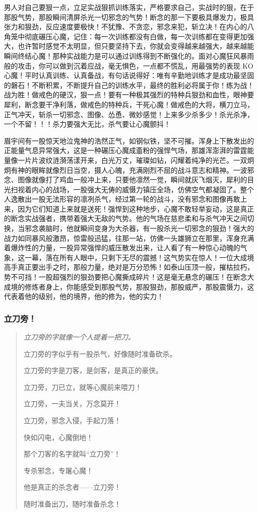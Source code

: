 男人对自己要狠一点，立足实战狠抓训练落实，严格要求自己，实战时的狠，在于那股气势，那股瞬间清屏杀光一切邪念的气势！断念的那一下要极具爆发力，极具张力和狠劲，反应速度要极快！不犹豫、不贪恋，邪念来犯，斩立决！在内心的八角笼中彻底碾压心魔，记住：每一次训练都没有白做，每一次训练都在变得更加强大，也许暂时感觉不太明显，但只要坚持下去，你就会变得越来越强大，越来越能瞬间终结心魔！那种实战能力是可以通过训练得到不断强化的。面对心魔狂风暴雨般的攻击，你可以做到沉着应战，毫无惧色，一点都不慌乱，用最强势的表现 KO 心魔！平时认真训练、认真备战，有句话说得好：唯有辛勤地训练才是成功最坚固的磐石！不断积累，不断提升自己的训练水平，最终的胜利必将属于你！练为战！战为胜！做戒色的硬汉，狠一点！要有一种极其强烈的特种兵狠劲和血性，眼神要犀利，断念要干净利落，做戒色的特种兵，干死心魔！做戒色的大将，横刀立马，正气冲天，斩杀一切邪念、图像、怂恿、微妙感觉！上来多少杀多少！杀光杀净，一个不留！！！杀力要强大无比，杀气要让心魔颤抖！

眉宇间有一股惊天地泣鬼神的浩然正气，如钢似铁，坚不可摧。浑身上下散发出的正能量气息异常强大，这是一种碾压心魔成齑粉的强悍气场，那雄浑澎湃的雷霆能量像一片片波纹涟漪荡漾开来，白光万丈，璀璨如钻，闪耀着纯净的光芒。一双炯炯有神的眼眸就像烈日当空，摄人心魄，充满刚烈不屈的战斗意志和精神。一波邪念、图像就像打了鸡血一般冲上来，只要他凛然一觉，瞬间就灰飞烟灭，犀利的目光扫视着内心的战场，一股强大无俦的威慑力镇压全场，仿佛空气都凝固了。整个人逸散出一股无法形容的凛冽杀气，经过第一轮的战斗，没有邪念和图像再敢上来，因为它们知道上来就是送死！强悍到这种地步，心魔不敢轻举妄动，这是真正的断念实战强者，携带着强大无敌的气势。他的气场在慈悲柔和与杀气冲天之间切换，当邪念袭脑时，他就瞬间变身为大杀器，有一股杀光一切邪念的狠劲！强大的战力如同暴风般激昂，惊雷般迅猛，往那一站，仿佛一头雄狮立在那里，浑身充满着爆炸性的力量，一股异常强悍的威压散发出来，让人看了有一种惊心动魄的气象，这一幕，落在所有人眼中，只剩下无尽的震撼！这气势实在惊人！一位大成境高手真正要出手之时，那般力量，绝对是万分恐怖！如泰山压顶一般，摧枯拉朽，势不可挡！一股超强烈的狠劲要把心魔撕成碎片！这是毫无悬念的碾压！在断念大成境的修炼者身上，你能感受到那股气势，那股狠劲，那股威严，那股震慑力，这代表着他的级别，他的境界，他的修为，他的实力！

\subsubsection{立刀旁！}

\begin{quotation}\it
    立刀旁的字就像一个人提着一把刀。

    立刀旁的字似乎有一股杀气，好像随时准备砍杀。

    立刀旁的字是刀客，是剑客，是真正的豪侠。

    立刀旁，刀已立，就等心魔前来喂刀！

    立刀旁，一夫当关，万念莫开！

    立刀旁，邪念入侵，手起刀落！

    快如闪电，心魔倒地！

    那个刀客的名字就叫“立刀旁”！

    专杀邪念，专屠心魔！

    他是真正的杀念者——立刀旁！

    随时准备出刀，随时准备杀念！
\end{quotation}

